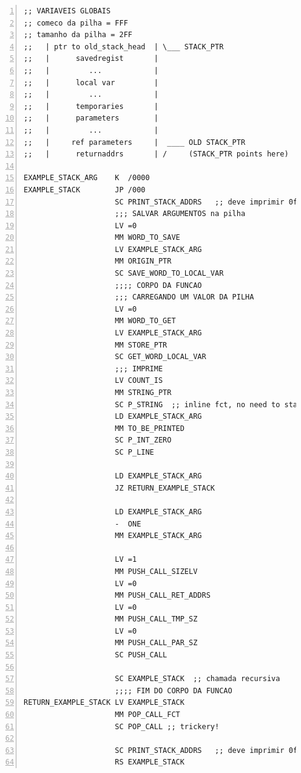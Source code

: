 \begin{lstlisting}[basicstyle=\footnotesize,numbers=left,breaklines=true,morekeywords={}]
;; VARIAVEIS GLOBAIS
;; comeco da pilha = FFF 
;; tamanho da pilha = 2FF 
;;   | ptr to old_stack_head  | \___ STACK_PTR
;;   |      savedregist       |   
;;   |         ...            |   
;;   |      local var         |  
;;   |         ...            |   
;;   |      temporaries       |  
;;   |      parameters        |   
;;   |         ...            |  
;;   |     ref parameters     |  ____ OLD STACK_PTR
;;   |      returnaddrs       | /     (STACK_PTR points here)

EXAMPLE_STACK_ARG    K  /0000
EXAMPLE_STACK        JP /000 
                     SC PRINT_STACK_ADDRS   ;; deve imprimir 0fff 
                     ;;; SALVAR ARGUMENTOS na pilha 
                     LV =0
                     MM WORD_TO_SAVE 
                     LV EXAMPLE_STACK_ARG 
                     MM ORIGIN_PTR 
                     SC SAVE_WORD_TO_LOCAL_VAR 
                     ;;;; CORPO DA FUNCAO 
                     ;;; CARREGANDO UM VALOR DA PILHA 
                     LV =0
                     MM WORD_TO_GET 
                     LV EXAMPLE_STACK_ARG 
                     MM STORE_PTR
                     SC GET_WORD_LOCAL_VAR 
                     ;;; IMPRIME 
                     LV COUNT_IS
                     MM STRING_PTR 
                     SC P_STRING  ;; inline fct, no need to stack 
                     LD EXAMPLE_STACK_ARG 
                     MM TO_BE_PRINTED 
                     SC P_INT_ZERO
                     SC P_LINE

                     LD EXAMPLE_STACK_ARG
                     JZ RETURN_EXAMPLE_STACK

                     LD EXAMPLE_STACK_ARG 
                     -  ONE 
                     MM EXAMPLE_STACK_ARG 

                     LV =1
                     MM PUSH_CALL_SIZELV
                     LV =0
                     MM PUSH_CALL_RET_ADDRS 
                     LV =0
                     MM PUSH_CALL_TMP_SZ
                     LV =0
                     MM PUSH_CALL_PAR_SZ 
                     SC PUSH_CALL

                     SC EXAMPLE_STACK  ;; chamada recursiva
                     ;;;; FIM DO CORPO DA FUNCAO 
RETURN_EXAMPLE_STACK LV EXAMPLE_STACK
                     MM POP_CALL_FCT 
                     SC POP_CALL ;; trickery!

                     SC PRINT_STACK_ADDRS   ;; deve imprimir 0fff 
                     RS EXAMPLE_STACK
\end{lstlisting}

